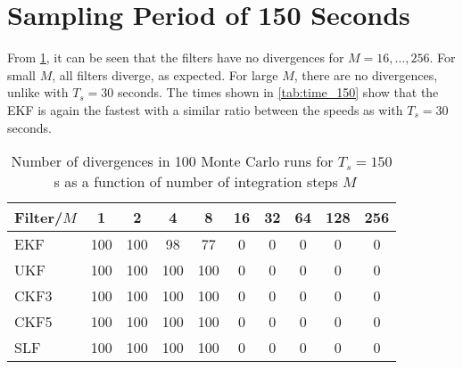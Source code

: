 \documentclass[../zhang_thesis.tex]{subfiles}
\begin{document}
%

%

\clearpage

\section{Sampling Period of 150 Seconds}

From \cref{tab:div_150}, it can be seen that the filters have no divergences for $M=16,\dots,256$. For small $M$, all filters diverge, as expected. For large $M$, there are no divergences, unlike with $T_s=30$ seconds. The times shown in \cref{tab:time_150} show that the EKF is again the fastest with a similar ratio between the speeds as with $T_s=30$ seconds. 

\begin{table}[h]
\centering
\caption{Number of divergences in 100 Monte Carlo runs for $T_s=150$~s as a function of number of integration steps $M$}
\begin{tabular}{@{}l*{9}{c}@{}}
\toprule
Filter/$M$ & 1   & 2   & 4   & 8   & 16 & 32 & 64 & 128 & 256 \\
\midrule
EKF        & 100 & 100 & 98  & 77  & 0  & 0  & 0  & 0   & 0   \\
UKF        & 100 & 100 & 100 & 100 & 0  & 0  & 0  & 0   & 0   \\
CKF3       & 100 & 100 & 100 & 100 & 0  & 0  & 0  & 0   & 0   \\
CKF5       & 100 & 100 & 100 & 100 & 0  & 0  & 0  & 0   & 0   \\
SLF        & 100 & 100 & 100 & 100 & 0  & 0  & 0  & 0   & 0   \\
\bottomrule
\end{tabular}
\label{tab:div_150}
\end{table}
\end{document}
